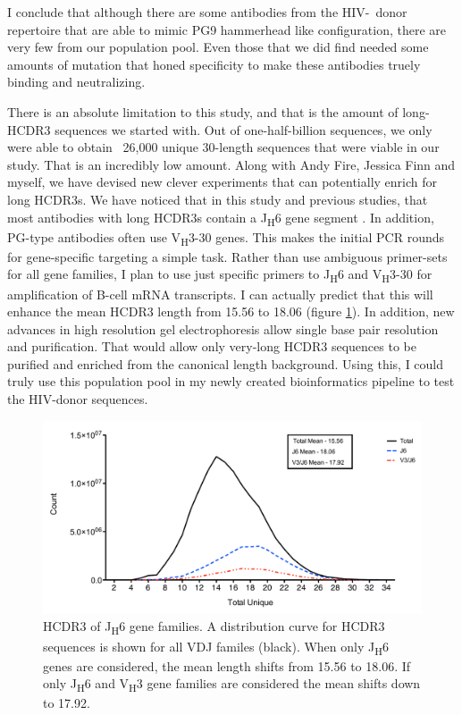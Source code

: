 I conclude that although there are some antibodies from the HIV-\naive~donor repertoire that are able to mimic PG9 hammerhead like configuration, there are very few from our population pool. Even those that we did find needed some amounts of mutation that honed specificity to make these antibodies truely binding and neutralizing.

There is an absolute limitation to this study, and that is the amount of long-HCDR3 sequences we started with. Out of one-half-billion sequences, we only were able to obtain ~26,000 unique 30-length sequences that were viable in our study. That is an incredibly low amount. Along with Andy Fire, Jessica Finn and myself, we have devised new clever experiments that can potentially enrich for long HCDR3s. We have noticed that in this study and previous studies, that most antibodies with long HCDR3s contain a J\textsubscript{H}6 gene segment \citep{Briney:2012ib}. In addition, PG-type antibodies often use V\textsubscript{H}3-30 genes. This makes the initial PCR rounds for gene-specific targeting a simple task. Rather than use ambiguous primer-sets for all gene families, I plan to use just specific primers to J\textsubscript{H}6 and V\textsubscript{H}3-30 for amplification of B-cell mRNA transcripts. I can actually predict that this will enhance the mean HCDR3 length from 15.56 to 18.06 (figure \ref{fig:fig5_3}). In addition, new advances in high resolution gel electrophoresis allow single base pair resolution and purification. That would allow only very-long HCDR3 sequences to be purified and enriched from the canonical length background. Using this, I could truly use this population pool in my newly created bioinformatics pipeline to test the HIV-\naive donor sequences.

\begin{figure}[!t]
   \centering
   \includegraphics[width=.9\textwidth]{images/chapter5/figure5_3.pdf}
   \caption[HCDR3 of J\textsubscript{H}6 Gene Families]{HCDR3 of J\textsubscript{H}6 gene families. A distribution curve for HCDR3 sequences is shown for all VDJ familes (black). When only J\textsubscript{H}6 genes are considered, the mean length shifts from 15.56 to 18.06. If only J\textsubscript{H}6 and V\textsubscript{H}3 gene families are considered the mean shifts down to 17.92.}
       \label{fig:fig5_3}
\end{figure}

